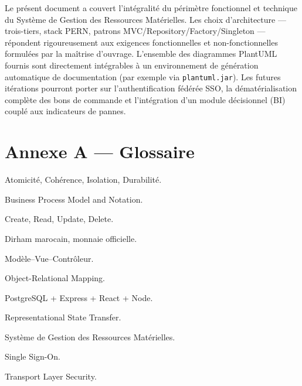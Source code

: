 \documentclass[a4paper,11pt,openany]{report}
\begin{document}
Le présent document a couvert l'intégralité du périmètre
fonctionnel et technique du Système de Gestion des Ressources
Matérielles. Les choix d'architecture — trois-tiers, stack PERN,
patrons MVC/Repository/Factory/Singleton — répondent
rigoureusement aux exigences fonctionnelles et non-fonctionnelles
formulées par la maîtrise d'ouvrage. L'ensemble des diagrammes
PlantUML fournis sont directement intégrables à un environnement
de génération automatique de documentation (par exemple via
\texttt{plantuml.jar}). Les futures itérations pourront porter
sur l'authentification fédérée SSO, la dématérialisation
complète des bons de commande et l'intégration d'un module
décisionnel (BI) couplé aux indicateurs de pannes.

\appendix
\chapter*{Annexe A --- Glossaire}

\begin{description}[leftmargin=*]
  \item[ACID] Atomicité, Cohérence, Isolation, Durabilité.
  \item[BPMN] Business Process Model and Notation.
  \item[CRUD] Create, Read, Update, Delete.
  \item[MAD] Dirham marocain, monnaie officielle.
  \item[MVC] Modèle--Vue--Contrôleur.
  \item[ORM] Object-Relational Mapping.
  \item[PERN] PostgreSQL + Express + React + Node.
  \item[REST] Representational State Transfer.
  \item[S-GRM] Système de Gestion des Ressources Matérielles.
  \item[SSO] Single Sign-On.
  \item[TLS] Transport Layer Security.
\end{description}
\end{document}
